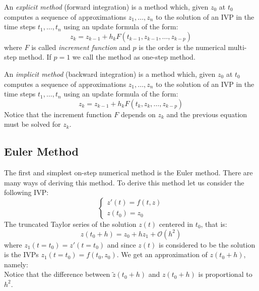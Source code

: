 \begin{definition}
	An \textit{explicit method} (forward integration) is
	a method which, given $z_0$ at $t_0$ computes a sequence
	of approximations $z_1, \dots, z_n$ to the solution of an
	IVP in the time steps $t_1, \dots, t_n$ using an update formula of the form:
	\begin{equation}
		z_k = z_{k-1} + h_kF(t_{k-1},z_{k-1},\dots,z_{k-p})
	\end{equation}
	where $F$ is called \textit{increment function} and $p$ is the
	order is the numerical multi-step method. If $p=1$ we call
	the method as one-step method. 
\end{definition}

\begin{definition}
	An \textit{implicit method} (backward integration)
	is a method which, given $z_0$ at $t_0$ computes a sequence
	of approximations $z_1, \dots, z_n$ to the solution of an IVP
	in the time steps $t_1, \dots, t_n$ using an update formula of the form:
	\begin{equation}
		z_k = z_{k-1} + h_kF(t_{k},z_{k},\dots,z_{k-p})
	\end{equation}
	Notice that the increment function $F$ depends on $z_k$
	and the previous equation must be solved for $z_k$.
\end{definition}

\subsection{Euler Method}
The first and simplest on-step numerical method is the Euler method.
There are many ways of deriving this method.
To derive this method let us consider the following IVP:
\begin{equation}
	\begin{cases}
		z'(t) = f(t,z) \\
		z(t_0)= z_0
	\end{cases}
\end{equation}
The truncated Taylor series of the solution $z(t)$ centered in $t_0$, that is:
\begin{equation}
	z(t_0+h) = z_0 + hz_1 + \mathcal{O}(h^2)
	\label{eq::taylor_euler}
\end{equation}
where $z_1(t=t_0)=z'(t=t_0)$ and since $z(t)$ is considered to
be the solution is the IVPs $z_1(t=t_0)=f(t_0,z_0)$.
We get an approximation of $z(t_0+h)$, namely:
\begin{equation}
	\label{eq::euler_0}
\end{equation}
Notice that the difference between $\tilde{z}(t_0+h)$ and $z(t_0+h)$ is proportional to $h^2$.

